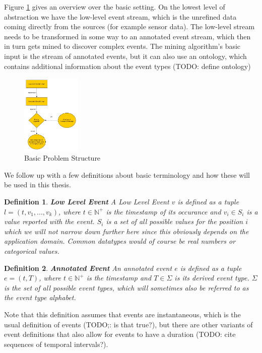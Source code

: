 \documentclass[journal]{IEEEtran}
\newtheorem{mydef}{Definition}
\begin{document}
Figure \ref{fig_basicProblemStructure} gives an overview over the basic setting. On the lowest level of abstraction we have the low-level event stream, which is the unrefined data coming directly from the sources (for example sensor data). The low-level stream needs to be transformed in some way to an annotated event stream, which then in turn gets mined to discover complex events. The mining algorithm's basic input is the stream of annotated events, but it can also use an ontology, which contains additional information about the event types (TODO: define ontology)
\begin{figure}[ht]
	\centering
  	\includegraphics[width=0.25\textwidth]{basicProblemStructure.jpg}
	\caption{Basic Problem Structure}
	\label{fig_basicProblemStructure}
\end{figure}

We follow up with a few definitions about basic terminology and how these will be used in this thesis.

\begin{mydef}
\textbf{Low Level Event} A Low Level Event $v$ is defined as a tuple $l= (t,v_1,...,v_k)$, where $t \in \mathbb{N}^+$ is the timestamp of its occurance and $v_i \in S_i$ is a value reported with the event. $S_i$ is a set of all possible values for the position $i$ which we will not narrow down further here since this obviously depends on the application domain. Common datatypes would of course be real numbers or categorical values.
\end{mydef}

\begin{mydef}
\textbf{Annotated Event} An annotated event $e$ is defined as a tuple $e=(t,T)$, where $t \in \mathbb{N}^+$ is the timestamp and $T \in \Sigma$ is its derived event type. $\Sigma$ is the set of all possible event types, which will sometimes also be referred to as the event type alphabet.
\end{mydef}
Note that this definition assumes that events are instantaneous, which is the usual definition of events (TODO;: is that true?), but there are other variants of event definitions that also allow for events to have a duration (TODO: cite sequences of temporal intervals?). \newline
\end{document}
